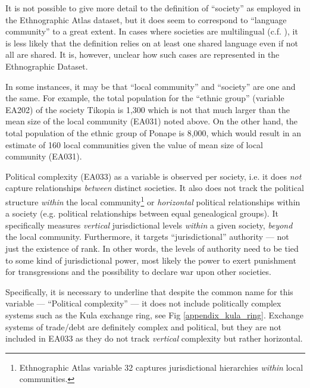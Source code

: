 \documentclass[12pt,letterpaper]{article}
\begin{document}
It is not possible to give more detail to the definition of ``society'' as employed in the Ethnographic Atlas dataset, but it does seem to correspond to ``language community'' to a great extent. In cases where societies are multilingual (c.f. \citet{evans2017did}), it is less likely that the definition relies on at least one shared language even if not all are shared. It is, however, unclear how such cases are represented in the Ethnographic Dataset.

In some instances, it may be that ``local community'' and ``society'' are one and the same. For example, the total population for the ``ethnic group'' (variable EA202) of the society Tikopia is 1,300 which is not that much larger than the mean size of the local community (EA031) noted above. On the other hand, the total population of the ethnic group of Ponape is 8,000, which would result in an estimate of 160 local communities given the value of mean size of local community (EA031).
  
Political complexity (EA033) as a variable is observed per society, i.e. it does \emph{not} capture relationships \emph{between} distinct societies. It also does not track the political structure \emph{within} the local community\footnote{Ethnographic Atlas variable 32 captures jurisdictional hierarchies \emph{within} local communities.} or \emph{horizontal} political relationships within a society (e.g. political relationships between equal genealogical groups). It specifically measures \emph{vertical} jurisdictional levels \emph{within} a given society, \emph{beyond} the local community. Furthermore, it targets ``jurisdictional'' authority --- not just the existence of rank. In other words, the levels of authority need to be tied to some kind of jurisdictional power, most likely the power to exert punishment for transgressions and the possibility to declare war upon other societies. 

Specifically, it is necessary to underline that despite the common name for this variable --- ``Political complexity'' --- it does not include politically complex systems such as the Kula exchange ring\citet{damon2002kula}, see Fig \ref{appendix_kula_ring}. Exchange systems of trade/debt are definitely complex and political, but they are not included in EA033 as they do not track \emph{vertical} complexity but rather horizontal.
\end{document}
